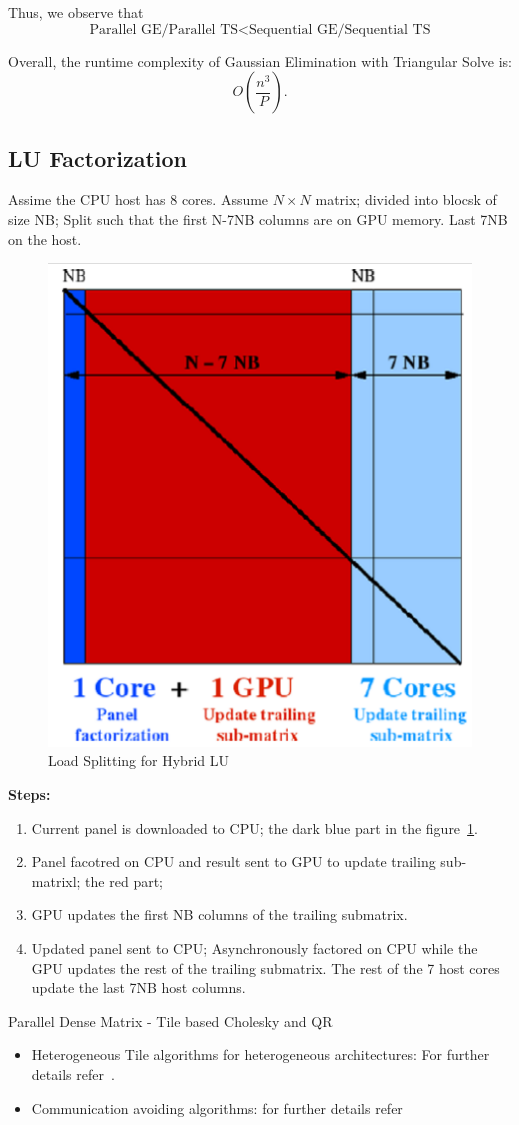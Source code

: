 \documentclass[12pt]{book}
\begin{document}
Thus, we observe that
\[
\text{Parallel GE/Parallel TS} < \text{Sequential GE/Sequential TS}
\]

Overall, the runtime complexity of Gaussian Elimination with Triangular Solve is:
\[
O\!\left(\frac{n^3}{P}\right).
\]


\subsection{LU Factorization}
Assime the CPU host has 8 cores. Assume $N\times N$ matrix; divided into blocsk of size NB; Split such that the first N-7NB columns are on GPU memory. Last 7NB on the host.
\begin{figure}[ht]
    \centering
    \includegraphics[width=0.5\linewidth]{images/Lufact.png}
    \caption{Load Splitting for Hybrid LU}
    \label{fig:LUfactsplit}
\end{figure}
\textbf{Steps:}
\begin{enumerate}
    \item Current panel is downloaded to CPU; the dark blue part in the figure~\ref{fig:LUfactsplit}.
    \item Panel facotred on CPU and result sent to GPU to update trailing sub-matrixl; the red part;
    \item GPU updates the first NB columns of the trailing submatrix.
    \item Updated panel sent to CPU; Asynchronously factored on CPU while the GPU updates the rest of the trailing submatrix. The rest of the 7 host cores update the last 7NB host columns.
\end{enumerate}

Parallel Dense Matrix - Tile based Cholesky and QR
\begin{itemize}
    \item Heterogeneous Tile algorithms for heterogeneous architectures: For further details refer~\cite{song2012enabling}.
    \item Communication avoiding algorithms: for further details refer~\cite{grigori2017introduction}
\end{itemize}
\end{document}
